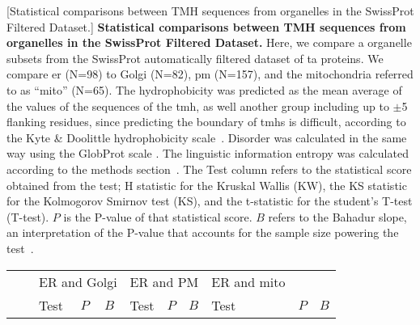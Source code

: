 	\begin{table}[htbp]
	\centering
	[Statistical comparisons between TMH sequences from organelles in the SwissProt Filtered Dataset.]
	{\textbf{Statistical comparisons between TMH sequences from organelles in the SwissProt Filtered Dataset.}
	Here, we compare a organelle subsets from the SwissProt automatically filtered dataset of \gls{ta} proteins.
	We compare \gls{er} (N=98) to Golgi (N=82), \gls{pm} (N=157), and the mitochondria referred to as ``mito'' (N=65).
	The hydrophobicity was predicted as the mean average of the values of the sequences of the \gls{tmh}, as well another group including up to $\pm$5 flanking residues, since predicting the boundary of \gls{tmh}s is difficult, according to the Kyte \& Doolittle hydrophobicity scale~\cite{Kyte1982}.
	Disorder was calculated in the same way using the GlobProt scale \cite{Linding2003}.
	The linguistic information entropy was calculated according to the methods section~\cite{Shannon1948}.
	The Test column refers to the statistical score obtained from the test; H statistic for the Kruskal Wallis (KW), the KS statistic for the Kolmogorov Smirnov test (KS), and the t-statistic for the student's T-test (T-test).
	$P$ is the P-value of that statistical score.
	$B$ refers to the Bahadur slope, an interpretation of the P-value that accounts for the sample size powering the test~\cite{Bahadur1967, Bahadur1971}.}
		\tiny

		 \begin{tabular}{ccccccccccc}
								&       & \multicolumn{3}{c}{ER and Golgi} & \multicolumn{3}{c}{ER and PM} & \multicolumn{1}{l}{ER and mito} &       &  \\
								&       & \multicolumn{1}{l}{Test} & \multicolumn{1}{l}{$P$} & \multicolumn{1}{l}{$B$} & \multicolumn{1}{l}{Test} & \multicolumn{1}{l}{$P$} & \multicolumn{1}{l}{$B$} & \multicolumn{1}{l}{Test} & \multicolumn{1}{l}{$P$} & \multicolumn{1}{l}{$B$} \\


\end{tabular}
\end{table}
